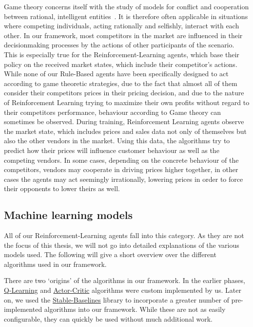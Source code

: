 Game theory concerns itself with the study of models for conflict and cooperation between rational, intelligent entities~\cite{GameTheory}. It is therefore often applicable in situations where competing individuals, acting rationally and selfishly, interact with each other. In our framework, most competitors in the market are influenced in their decisionmaking processes by the actions of other participants of the scenario. This is especially true for the Reinforcement-Learning agents, which base their policy on the received market states, which include their competitor's actions. While none of our Rule-Based agents have been specifically designed to act according to game theoretic strategies, due to the fact that almost all of them consider their competitors prices in their pricing decision, and due to the nature of Reinforcement Learning trying to maximize their own profits without regard to their competitors performance, behaviour according to Game theory can sometimes be observed.  During training, Reinforcement Learning agents observe the market state, which includes prices and sales data not only of themselves but also the other vendors in the market. Using this data, the algorithms try to predict how their prices will influence customer behaviour as well as the competing vendors. In some cases, depending on the concrete behaviour of the competitors, vendors may cooperate in driving prices higher together, in other cases the agents may act seemingly irrationally, lowering prices in order to force their opponents to lower theirs as well. 

\subsection*{Machine learning models}

All of our Reinforcement-Learning agents fall into this category. As they are not the focus of this thesis, we will not go into detailed explanations of the various models used. The following will give a short overview over the different algorithms used in our framework.

There are two `origins' of the algorithms in our framework. In the earlier phases, \hyperref[item:QLearning]{Q-Learning} and \hyperref[item:ActorCritic]{Actor-Critic} algorithms were custom implemented by us. Later on, we used the \hyperref[item:StableBaselines]{Stable-Baselines} library to incorporate a greater number of pre-implemented algorithms into our framework. While these are not as easily configurable, they can quickly be used without much additional work.

